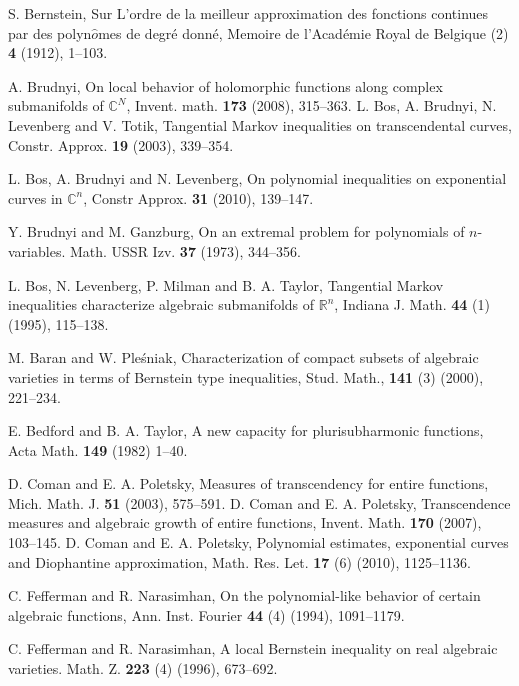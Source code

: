 \documentclass[11pt, oneside]{amsart}
\begin{document}
\begin{thebibliography}{}

S. Bernstein, Sur L'ordre de la meilleur approximation des fonctions continues par des polyn{\rm $\hat{o}$}mes de degr\'e donn\'e, Memoire de l'Acad\'emie Royal de Belgique (2) {\bf 4} (1912), 1--103.

A. Brudnyi, On local behavior of holomorphic functions along complex submanifolds of $\mathbb C^N$, Invent. math. {\bf 173} (2008), 315--363.
L. Bos, A. Brudnyi, N. Levenberg and V. Totik, Tangential Markov inequalities on transcendental
curves, Constr. Approx. {\bf 19} (2003), 339--354. 

L. Bos, A. Brudnyi and N. Levenberg, On polynomial inequalities on exponential curves in $\mathbb C^n$, Constr Approx. {\bf 31} (2010), 
139--147.

Y. Brudnyi and  M. Ganzburg, On an extremal problem for polynomials of $n$-variables. Math. USSR Izv. {\bf 37} (1973), 344--356.

L. Bos, N. Levenberg, P. Milman and B. A. Taylor, Tangential Markov inequalities characterize 
algebraic submanifolds of $\mathbb R^n$, Indiana J. Math. {\bf 44} (1) (1995), 115--138.

M. Baran and W. Ple\'sniak,
Characterization of compact subsets of algebraic varieties in terms of Bernstein type inequalities,
Stud. Math., {\bf 141} (3) (2000), 221--234.

E. Bedford and B. A. Taylor, A new capacity for plurisubharmonic functions, Acta Math. {\bf 149} (1982) 1--40.

D. Coman and E. A. Poletsky, Measures of transcendency for entire functions, Mich. Math. J. {\bf 51} (2003), 575--591.
D. Coman and E. A. Poletsky, Transcendence measures and algebraic growth of entire functions, Invent.
Math. {\bf 170} (2007), 103--145.
D. Coman and E. A. Poletsky, Polynomial estimates, exponential curves and Diophantine approximation, Math. Res. Let. {\bf 17} (6) (2010),
1125--1136. 

C. Fefferman and R. Narasimhan, On the polynomial-like behavior of certain algebraic functions,  Ann. Inst. Fourier {\bf 44} (4) (1994), 1091--1179.

C. Fefferman and R. Narasimhan, A local Bernstein inequality on real algebraic varieties. Math. Z. {\bf 223} (4) (1996), 673--692.


\end{thebibliography}
\end{document}
